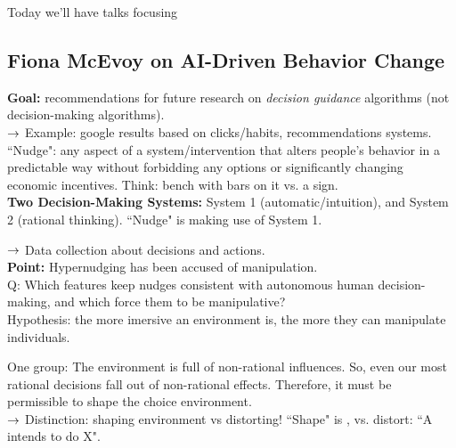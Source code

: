 Today we'll have talks focusing

\subsection{Fiona McEvoy on AI-Driven Behavior Change}

{\bf Goal:} recommendations for future research on {\it decision guidance} algorithms (not decision-making algorithms). \\

$\rightarrow$ Example: google results based on clicks/habits, recommendations systems. \\

``Nudge": any aspect of a system/intervention that alters people's behavior in a predictable way without forbidding any options or significantly changing economic incentives. Think: bench with bars on it vs. a sign. \\

{\bf Two Decision-Making Systems:} System 1 (automatic/intuition), and System 2 (rational thinking). ``Nudge" is making use of System 1. \\


$\rightarrow$ Data collection about decisions and actions. \\

{\bf Point:} Hypernudging has been accused of manipulation. \\

Q: Which features keep nudges consistent with autonomous human decision-making, and which force them to be manipulative? \\

Hypothesis: the more imersive an environment is, the more they can manipulate individuals. \\


One group: The environment is full of non-rational influences. So, even our most rational decisions fall out of non-rational effects. Therefore, it must be permissible to shape the choice environment. \\

$\rightarrow$ Distinction: shaping environment vs distorting! ``Shape" is , vs. distort: ``A intends to do X". \\


